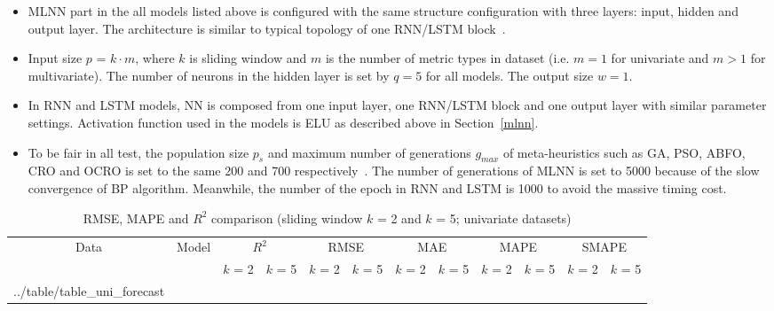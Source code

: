 \documentclass[11pt,twoside]{article}
\makeatletter
\newcommand\primitiveinput[1]
		{\@@input #1 }
\makeatother
\begin{document}
\begin{multicols}{2}
\begin{itemize}
\item MLNN part in the all models listed above is configured with the same structure configuration with three layers: input, hidden and output layer. The architecture is similar to typical topology of one RNN/LSTM block~\citep{ref_xiaolei}. 
\item Input size $p$ = $k \cdot m$, where $k$ is sliding window and $m$ is the number of metric types in dataset (i.e. $m=1$ for univariate and $m>1$ for multivariate). The number of neurons in the hidden layer is set by $q=5$ for all models. The output size $w=1$. 
\item In RNN and LSTM models, NN is composed from one input layer, one RNN/LSTM block and one output layer with similar parameter settings. Activation function used in the models is ELU as described above in Section~\ref{mlnn}.
\item To be fair in all test, the population size $p_s$ and maximum number of generations $g_{max}$ of meta-heuristics such as GA, PSO, ABFO, CRO and OCRO is set to the same 200 and 700 respectively~\citep{ref_thieu}. The number of generations of MLNN is set to 5000 because of the slow convergence of BP algorithm. Meanwhile, the number of the epoch in RNN and LSTM is 1000 to avoid the massive timing cost.
\end{itemize}



\begin{table}[t]
	\caption{RMSE, MAPE and $R^2$ comparison (sliding window $k$ = 2 and $k$ = 5; univariate datasets)}
	\label{table:uni_forecast}
	\centering
	\begin{adjustbox}{height=0.77\textheight, angle=270}
	\begin{sideways}
		\begin{tabular}{| c | c | c | c | c | c | c | c | c | c | c | c |}%
			\hline
			\multirow{2}{*}{Data} & \multirow{2}{*}{Model} & \multicolumn{2}{c|}{$R^2$} & \multicolumn{2}{c|}{RMSE} & \multicolumn{2}{c|}{MAE} & \multicolumn{2}{c|}{MAPE}  & \multicolumn{2}{c|}{SMAPE} \\ \cline{3-12}
   				& & $k$ = 2 & $k$ = 5 & $k$ = 2 & $k$ = 5 & $k$ = 2 & $k$ = 5 & $k$ = 2 & $k$ = 5 & $k$ = 2 & $k$ = 5 \\ [0.5ex] 
			\hline
			\primitiveinput{../table/table_uni_forecast}
			\hline
		\end{tabular}
	\end{sideways}
	\end{adjustbox}
\end{table}



\end{multicols}
\end{document}
